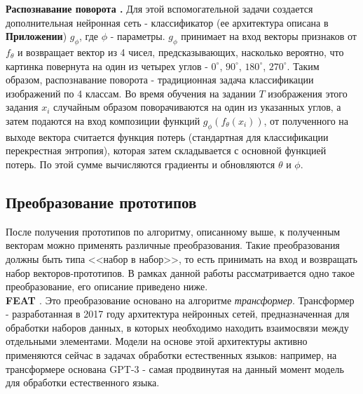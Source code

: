\documentclass[a4paper, 12pt]{report}
\begin{document}
\textbf {Распознавание поворота \cite{rotation}.} Для этой вспомогательной задачи создается дополнительная нейронная сеть - классификатор (ее архитектура описана в \textbf{Приложении}) $g_{\phi}$, где $\phi$ - параметры. $g_{\phi}$ принимает на вход векторы признаков от $f_{\theta}$ и возвращает вектор из 4 чисел, предсказывающих, насколько вероятно, что картинка повернута на один из четырех углов - $0^{\circ}$, $90^{\circ}$, $180^{\circ}$, $270^{\circ}$. Таким образом, распознавание поворота - традиционная задача классификации изображений по 4 классам. Во время обучения на задании $T$ изображения этого задания $x_{i}$ случайным образом поворачиваются на один из указанных углов, а затем подаются на вход композиции функций $g_{\phi}(f_{\theta}(x_i))$, от полученного на выходе вектора считается функция потерь (стандартная для классификации перекрестная энтропия), которая затем складывается с основной функцией потерь. По этой сумме вычисляются градиенты и обновляются $\theta$ и $\phi$.

\subsection{Преобразование прототипов}
После получения прототипов по алгоритму, описанному выше, к полученным векторам можно применять различные преобразования. Такие преобразования должны быть типа <<набор в набор>>, то есть принимать на вход и возвращать набор векторов-прототипов. В рамках данной работы рассматривается одно такое преобразование, его описание приведено ниже.\\

\textbf {FEAT \cite{setset}}. Это преобразование основано на алгоритме \textit{трансформер}. Трансформер - разработанная в 2017 году архитектура нейронных сетей, предназначенная для обработки наборов данных, в которых необходимо находить взаимосвязи между отдельными элементами. Модели на основе этой архитектуры активно применяются сейчас в задачах обработки естественных языков: например, на трансформере основана GPT-3 - самая продвинутая на данный момент модель для обработки естественного языка. \\
\end{document}
